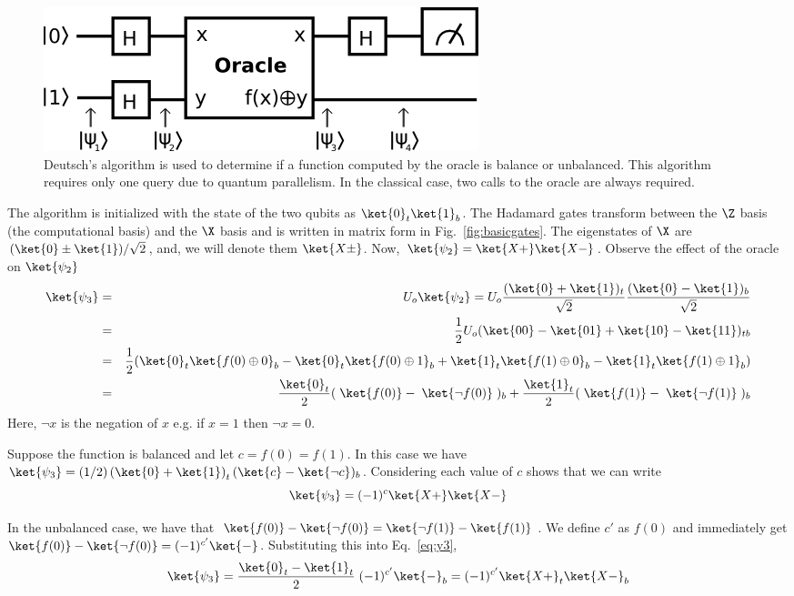 \documentclass[11pt,oneside,final]{huthesis}%
\begin{document}
\begin{figure}\label{fig:deutsch}
	\begin{center}
	\includegraphics{./figures/deutsch.png}
	\end{center}
	\caption{Deutsch's algorithm is used to determine if a function computed by the oracle is balance or unbalanced.  This algorithm requires only one query due to quantum parallelism.  In the classical case, two calls to the oracle are always required.}
\end{figure}

The algorithm is initialized with the state of the two qubits as $\ket{0}_t\ket{1}_b$.  The Hadamard gates transform between the $\Z$ basis (the computational basis) and the $\X$ basis and is written in matrix form in Fig.~\ref{fig:basicgates}.  The eigenstates of $\X$ are $(\ket{0}\pm \ket{1})/\sqrt{2}$, and, we will denote them $\ket{X\pm}$.  Now, $\ket{\psi_2}=\ket{X+}\ket{X-}$.  Observe the effect of the oracle on $\ket{\psi_2}$
\begin{eqnarray}
	\ket{	\psi_3}&=&U_o\ket{\psi_2}	=U_o\frac{(\ket{0}+\ket{1})_{t}}{\sqrt{2}}\frac{(\ket{0}-\ket{1})_{b}}{\sqrt{2}}\nonumber\\
	&=&\frac{1}{2}U_o(\ket{00}-\ket{01}+\ket{10}-\ket{11})_{tb}\nonumber\\
	&=& \frac{1}{{2}}(\ket{0}_t\ket{f(0)\oplus 0 }_b-\ket{0}_t\ket{ f(0)\oplus 1}_b+\ket{1 }_t\ket{ f(1)\oplus0 }_b-\ket{1}_t\ket{  f(1)\oplus 1}_b)\nonumber\\
	&=& \frac{\ket{0}_t}{{2}}(\;\ket{f(0)}-\;\ket{\neg f(0)}\;)_b+\frac{\ket{1 }_t}{2}(\;\ket{ f(1)}-\;\ket{  \neg f(1)}\;)_b\label{eq:y3}
\end{eqnarray}
Here, $\neg x$ is the negation of $x$ e.g. if $x=1$ then $\neg x=0$. 

Suppose the function is balanced and let $c=f(0)=f(1)$.  In this case we have $\ket{\psi_3}=(1/2)\left( \ket{0}+\ket{1}\right)_t(\ket{c}-\ket{\neg c})_b$.  Considering each value of $c$ shows that  we can write \[\ket{\psi_3}=(-1)^{c}\ket{X+}\ket{X-}\] 

In the unbalanced case, we have that $\ket{f(0)}-\ket{\neg f(0)}=\ket{\neg f(1)}-\ket{f(1)}$. We define $c'$ as $ f(0)$ and immediately get $\ket{f(0)}-\ket{\neg f(0)}=(-1)^{c'}\ket{-}$.  Substituting this into Eq.~\eqref{eq:y3},
\[\ket{\psi_3}=\frac{\ket{0}_t-\ket{1}_t}{2}\; (-1)^{c'}\ket{-}_b=(-1)^{c'}\ket{X+}_t\ket{X-}_b\]  
\end{document}

